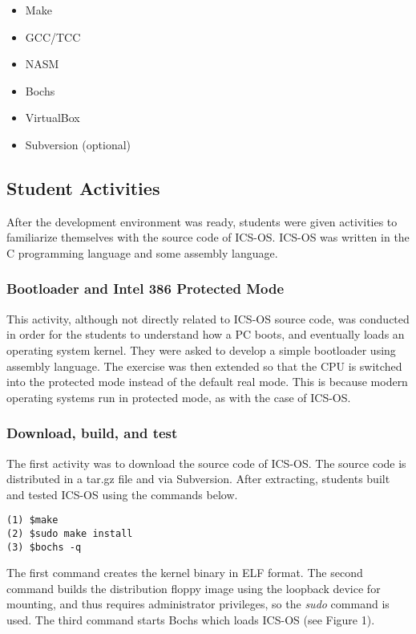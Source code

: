 \documentclass{acm_proc_article-sp}
\begin{document}
\begin{itemize}
 \item Make
 \item GCC/TCC
 \item NASM
 \item Bochs
 \item VirtualBox
 \item Subversion (optional)
\end{itemize}

\subsection{Student Activities}
After the development environment was ready, students were given activities
to familiarize themselves with the source code of ICS-OS. ICS-OS was written
in the C programming language and some assembly language.

\subsubsection{Bootloader and Intel 386 Protected Mode}
This activity, although not directly related to ICS-OS source code, was 
conducted in order for the students to understand how a PC boots, and 
eventually loads an operating system kernel. They were asked to develop a
simple bootloader using assembly language. The exercise was then extended so
that the CPU is switched into the protected mode instead of the default 
real mode. This is because modern operating systems run in protected mode, 
as with the case of ICS-OS.

\subsubsection{Download, build, and test}
The first activity was to download the source code of ICS-OS\cite{icsos:site}.
The source code is distributed in a tar.gz file and via Subversion. 
After extracting, students built and tested ICS-OS using the commands below.
\begin{verbatim}
(1) $make
(2) $sudo make install
(3) $bochs -q
\end{verbatim}

The first command creates the kernel binary in ELF format. The second command 
builds the distribution floppy image using the loopback device for mounting,
and thus requires administrator privileges, so the \textit{sudo} command is 
used. The third command starts Bochs\cite{bochs:site} which loads ICS-OS (see 
Figure 1).
\end{document}
